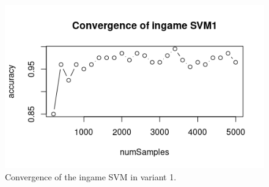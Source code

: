 \documentclass[11pt]{article}
\newcommand\BibTeX{B{\sc ib}\TeX}
\begin{document}
\begin{figure}[H]
	\centering
	\includegraphics[width=.45\textwidth]{../testdata/conv_ingameSVM1.png}
	\caption{Convergence of the ingame SVM in variant 1.}
	\label{fig:conv_ingameSVM1}
\end{figure}




\end{document}
